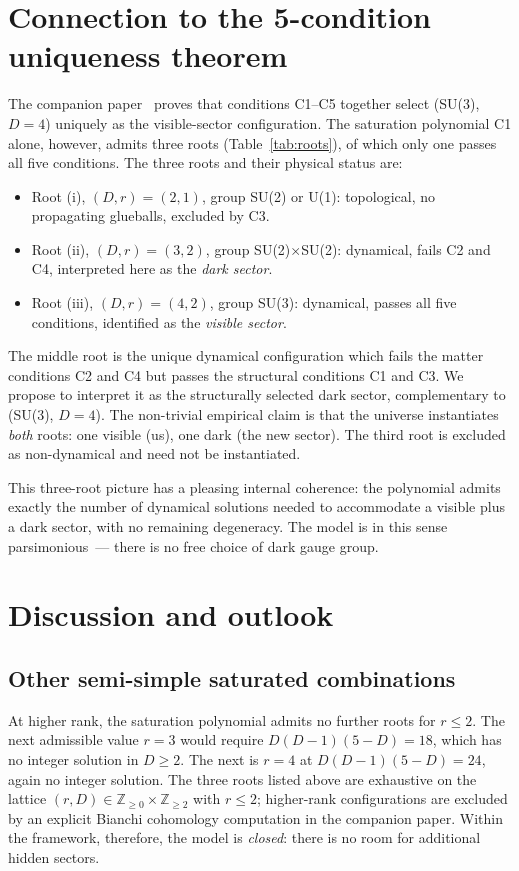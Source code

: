 \documentclass[aps,prd,twocolumn,nofootinbib,superscriptaddress,floatfix]{revtex4-2}
\begin{document}
\section{Connection to the 5-condition uniqueness theorem}
\label{sec:companion}

The companion paper~\cite{Remondiere2026companion} proves that conditions C1--C5 together select (SU(3), $D=4$) uniquely as the visible-sector configuration. The saturation polynomial C1 alone, however, admits three roots (Table~\ref{tab:roots}), of which only one passes all five conditions. The three roots and their physical status are:
\begin{itemize}
    \item Root (i), $(D,r)=(2,1)$, group SU(2) or U(1): topological, no propagating glueballs, excluded by C3.
    \item Root (ii), $(D,r)=(3,2)$, group SU(2)$\times$SU(2): dynamical, fails C2 and C4, interpreted here as the \emph{dark sector}.
    \item Root (iii), $(D,r)=(4,2)$, group SU(3): dynamical, passes all five conditions, identified as the \emph{visible sector}.
\end{itemize}
The middle root is the unique dynamical configuration which fails the matter conditions C2 and C4 but passes the structural conditions C1 and C3. We propose to interpret it as the structurally selected dark sector, complementary to (SU(3), $D=4$). The non-trivial empirical claim is that the universe instantiates \emph{both} roots: one visible (us), one dark (the new sector). The third root is excluded as non-dynamical and need not be instantiated.

This three-root picture has a pleasing internal coherence: the polynomial admits exactly the number of dynamical solutions needed to accommodate a visible plus a dark sector, with no remaining degeneracy. The model is in this sense parsimonious~--- there is no free choice of dark gauge group.

\section{Discussion and outlook}
\label{sec:discussion}

\subsection{Other semi-simple saturated combinations}
At higher rank, the saturation polynomial admits no further roots for $r\leq 2$. The next admissible value $r=3$ would require $D(D-1)(5-D)=18$, which has no integer solution in $D\geq 2$. The next is $r=4$ at $D(D-1)(5-D)=24$, again no integer solution. The three roots listed above are exhaustive on the lattice $(r,D)\in\mathbb{Z}_{\geq 0}\times\mathbb{Z}_{\geq 2}$ with $r\leq 2$; higher-rank configurations are excluded by an explicit Bianchi cohomology computation in the companion paper. Within the framework, therefore, the model is \emph{closed}: there is no room for additional hidden sectors.
\end{document}
